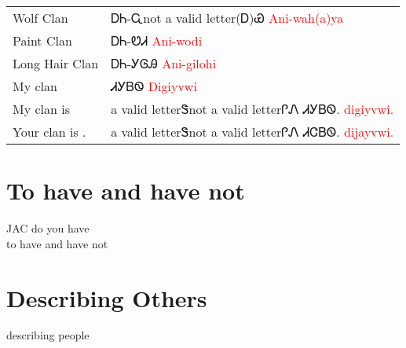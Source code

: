 \vfill\newpage\begin{minipage}{\linewidth}\begin{tabular}{p{5cm} p{9cm}}
Wolf Clan & ᎠᏂ-Ꮹnot a valid letter(Ꭰ)Ꮿ 
 \newline \textcolor{red}{Ani-wah(a)ya}\\
Paint Clan & ᎠᏂ-ᏬᏗ 
 \newline \textcolor{red}{Ani-wodi}\\
Long Hair Clan & ᎠᏂ-ᎩᎶᎯ 
 \newline \textcolor{red}{Ani-gilohi}\\
My clan & ᏗᎩᏴᏫ 
 \newline \textcolor{red}{Digiyvwi}\\
My clan is  &  a valid letterᏕnot a valid letterᎵᏁ{    } ᏗᎩᏴᏫ. 
 \newline \textcolor{red}{\underline{    } digiyvwi.}\\
Your clan is . &  a valid letterᏕnot a valid letterᎵᏁ{    } ᏗᏣᏴᏫ. 
 \newline \textcolor{red}{\underline{    } dijayvwi.}\\
\end{tabular}
\end{minipage}

\chapter*{To have and have not}
JAC do you have\\
to have and have not\\
\chapter*{Describing Others}
describing people\\
\index{}
